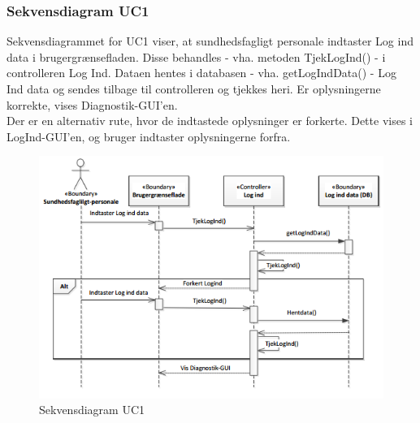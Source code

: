 \subsubsection{Sekvensdiagram UC1}
Sekvensdiagrammet for UC1 viser, at sundhedsfagligt personale indtaster Log ind data i brugergrænsefladen. Disse behandles - vha. metoden TjekLogInd() - i controlleren Log Ind. Dataen hentes i databasen - vha. getLogIndData() - Log Ind data og sendes tilbage til controlleren og tjekkes heri. Er oplysningerne korrekte, vises Diagnostik-GUI'en. \\
Der er en alternativ rute, hvor de indtastede oplysninger er forkerte. Dette vises i LogInd-GUI'en, og bruger indtaster oplysningerne forfra.
\begin{figure}[H]
\centering
\includegraphics[scale=0.70]{sd1.PNG}
\caption{Sekvensdiagram UC1}
\end{figure}

